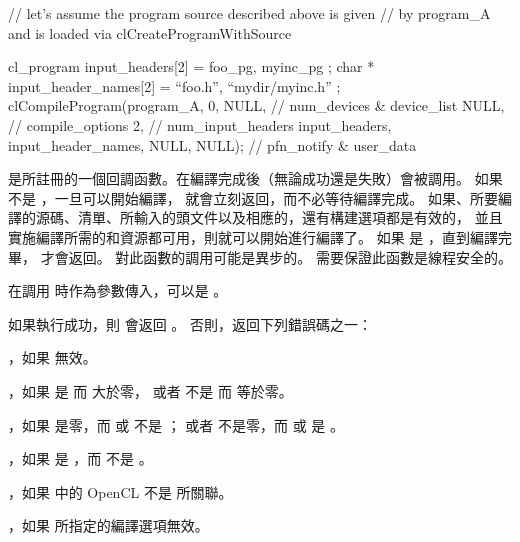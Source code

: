 // let’s assume the program source described above is given
// by program_A and is loaded via clCreateProgramWithSource

cl_program input_headers[2] = { foo_pg, myinc_pg };
char * input_header_names[2] = { “foo.h”, “mydir/myinc.h” };
clCompileProgram(program_A,
		0, NULL,	// num_devices & device_list
		NULL,		// compile_options
		2,		// num_input_headers
		input_headers,
		input_header_names,
		NULL, NULL);	// pfn_notify & user_data
\stopclc

 是所註冊的一個回調函數。在編譯完成後（無論成功還是失敗）會被調用。
如果  不是 ，一旦可以開始編譯，  就會立刻返回，而不必等待編譯完成。
如果、所要編譯的源碼、清單、所輸入的頭文件以及相應的，還有構建選項都是有效的，
並且實施編譯所需的和資源都可用，則就可以開始進行編譯了。
如果  是 ，直到編譯完畢，  才會返回。
對此函數的調用可能是異步的。
需要保證此函數是線程安全的。

 在調用  時作為參數傳入，可以是 。

如果執行成功，則  會返回 。
否則，返回下列錯誤碼之一：
\startigBase
\item {}，如果  無效。

\item {}，如果  是  而  大於零，
或者  不是  而  等於零。

\item {}，如果  是零，而  或  不是 ；
或者  不是零，而  或  是 。

\item {}，如果  是 ，而  不是 。

\item {}，如果  中的 OpenCL  不是  所關聯。

\item {}，如果  所指定的編譯選項無效。

